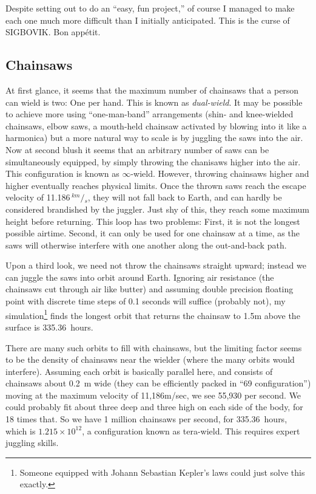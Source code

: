 \documentclass[twocolumn]{article}
\newcommand\sfrac[2]{\!{}\,^{#1}\!/{}\!_{#2}}
\begin{document}
Despite setting out to do an ``easy, fun project,'' of course I
managed to make each one much more difficult than I initially
anticipated. This is the curse of SIGBOVIK. Bon app\'etit.

\subsection{Chainsaws}

At first glance, it seems that the maximum number of chainsaws that a
person can wield is two: One per hand. This is known as {\em
  dual-wield}. It may be possible to achieve more using
``one-man-band'' arrangements (shin- and knee-wielded chainsaws, elbow
saws, a mouth-held chainsaw activated by blowing into it like a
harmonica) but a more natural way to scale is by juggling the saws
into the air. Now at second blush it seems that an arbitrary number of
saws can be simultaneously equipped, by simply throwing the chanisaws
higher into the air. This configuration is known as $\infty$-wield.
However, throwing chainsaws higher and higher eventually reaches
physical limits. Once the thrown saws reach the escape velocity of
11.186$\sfrac{km}{s}$, they will not fall back to Earth, and can
hardly be considered brandished by the juggler. Just shy of this, they
reach some maximum height before returning. This loop has two
problems: First, it is not the longest possible airtime. Second, it
can only be used for one chainsaw at a time, as the saws will
otherwise interfere with one another along the out-and-back path.

Upon a third look, we need not throw the chainsaws straight upward;
instead we can juggle the saws into orbit around Earth. Ignoring air
resistance (the chainsaws cut through air like butter) and assuming
double precision floating point with discrete time steps of 0.1
seconds will suffice (probably not), my simulation\footnote{ Someone
  equipped with Johann Sebastian Kepler's laws could just solve this
  exactly.} finds the longest orbit that returns the chainsaw to 1.5m
above the surface is 335.36~hours.

There are many such orbits to fill with chainsaws, but the limiting
factor seems to be the density of chainsaws near the wielder (where
the many orbits would interfere). Assuming each orbit is basically
parallel here, and consists of chainsaws about 0.2~m wide (they can be
efficiently packed in ``69 configuration'') moving at the maximum
velocity of 11,186m/sec, we see 55,930 per second. We could probably
fit about three deep and three high on each side of the body, for 18
times that. So we have 1 million chainsaws per second, for
335.36~hours, which is $1.215 \times 10^{12}$, a configuration known
as tera-wield. This requires expert juggling skills.
\end{document}
